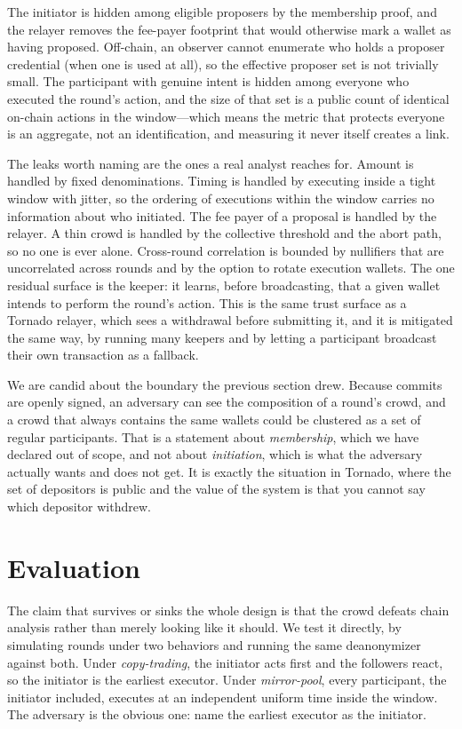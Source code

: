 \documentclass[11pt]{article}
\begin{document}
The initiator is hidden among eligible proposers by the membership proof, and the
relayer removes the fee-payer footprint that would otherwise mark a wallet as
having proposed. Off-chain, an observer cannot enumerate who holds a proposer
credential (when one is used at all), so the effective proposer set is not
trivially small. The participant with genuine intent is hidden among everyone who
executed the round's action, and the size of that set is a public count of
identical on-chain actions in the window---which means the metric that protects
everyone is an aggregate, not an identification, and measuring it never itself
creates a link.

The leaks worth naming are the ones a real analyst reaches for. Amount is handled
by fixed denominations. Timing is handled by executing inside a tight window with
jitter, so the ordering of executions within the window carries no information
about who initiated. The fee payer of a proposal is handled by the relayer.
A thin crowd is handled by the collective threshold and the abort path, so no one
is ever alone. Cross-round correlation is bounded by nullifiers that are
uncorrelated across rounds and by the option to rotate execution wallets. The one
residual surface is the keeper: it learns, before broadcasting, that a given
wallet intends to perform the round's action. This is the same trust surface as a
Tornado relayer, which sees a withdrawal before submitting it, and it is
mitigated the same way, by running many keepers and by letting a participant
broadcast their own transaction as a fallback.

We are candid about the boundary the previous section drew. Because commits are
openly signed, an adversary can see the composition of a round's crowd, and a
crowd that always contains the same wallets could be clustered as a set of
regular participants. That is a statement about \emph{membership}, which we have
declared out of scope, and not about \emph{initiation}, which is what the
adversary actually wants and does not get. It is exactly the situation in Tornado,
where the set of depositors is public and the value of the system is that you
cannot say which depositor withdrew.

\section{Evaluation}
\label{sec:eval}

The claim that survives or sinks the whole design is that the crowd defeats chain
analysis rather than merely looking like it should. We test it directly, by
simulating rounds under two behaviors and running the same deanonymizer against
both. Under \emph{copy-trading}, the initiator acts first and the followers react,
so the initiator is the earliest executor. Under \emph{mirror-pool}, every
participant, the initiator included, executes at an independent uniform time
inside the window. The adversary is the obvious one: name the earliest executor
as the initiator.
\end{document}
